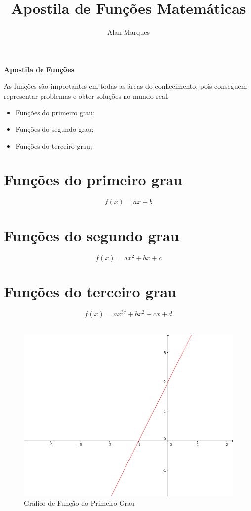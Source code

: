 \documentclass[12pt,a4paper,titlepage]{article}
\author{Alan Marques}
\title{\textbf{Apostila de Funções Matemáticas}}
\begin{document}
\maketitle
\listoffigures
\newpage

\tableofcontents
\newpage
	
	\begin{center}
		\textbf{\large Apostila de Funções}\\
	\end{center}

	As funções são importantes em todas as áreas do conhecimento, pois conseguem
	representar problemas e obter soluções no mundo real.
	
	\begin{itemize}
		\item Funções do primeiro grau;
		\item Funções do segundo grau;
		\item Funções do terceiro grau;
	\end{itemize}

\section{Funções do primeiro grau}

\begin{equation}
	f(x) = ax+b
\end{equation}

\section{Funções do segundo grau}

\begin{equation}
	f(x) = ax^{2} + bx + c	
\end{equation}

\section{Funções do terceiro grau}

\begin{equation}
	f(x) = ax^{3x} + bx^2 + cx + d
\end{equation}\\


\begin{figure}[!h]
\centering
\includegraphics[width=0.7\linewidth]{./primeirograu}
\caption{Gráfico de Função do Primeiro Grau}
\label{fig:primeirograu}
\end{figure}
\end{document}
